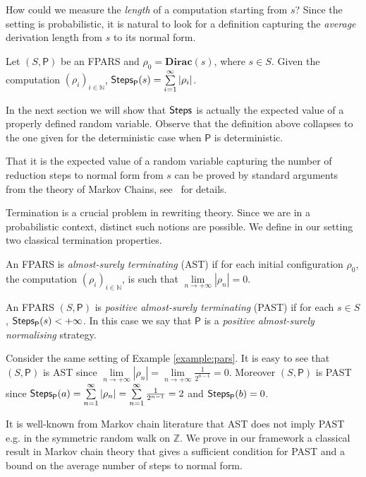 How could we measure the \emph{length} of a computation starting from $s$? Since the setting is probabilistic, it is natural
to look for a definition capturing the \emph{average} derivation length from
$s$ to its normal form. 
\begin{definition}
	Let $(S,\mathsf{P})$ be an FPARS and $\rho_0=\mathbf{Dirac}(s)$,
	where $s\in S$. Given the computation $(\rho_i)_{i\in\mathbb{N}}$,
	$\textsf{Steps}_{\mathsf{P}}(s)=\sum\limits_{i=1}^{\infty} \left|\rho_i\right|$.
\end{definition}
In the next section we will show that $\textsf{Steps}_{}$ is actually the expected value of a properly defined random variable. Observe that the definition above collapses to the one given for the
deterministic case when $\mathsf{P}$ is deterministic. 
\begin{SHORT}
	That it is the expected value of a random variable capturing the number of reduction
	steps to normal form from $s$ can be proved by standard arguments
	from the theory of Markov Chains, see~\cite{EV} for details.
\end{SHORT}
Termination is a crucial problem in rewriting theory. Since we are in
a probabilistic context, distinct such notions are
possible. We define in our setting two classical termination
properties.  
\begin{definition}[AST]
	An FPARS is \emph{almost-surely terminating} (AST) if for each initial configuration $\rho_0$, the computation $(\rho_i)_{i\in\mathbb{N}}$, is such that $\underset{n\rightarrow +\infty}{\lim}\left|\rho_{n}\right|=0$.
\end{definition}
\begin{definition}[PAST]
	An FPARS $(S,\mathsf{P})$ is \emph{positive almost-surely terminating} (PAST) if for each $s \in S$,
	$\textsf{Steps}_{\mathsf{P}}(s)< +\infty$.
	In this case we say that $\mathsf{P}$ is a \emph{positive almost-surely normalising} strategy.
\end{definition}
\begin{example}
	Consider the same setting of Example \ref{example:pars}. It is easy to see that $(S,\mathsf{P})$ is AST since $\underset{n\rightarrow +\infty}{\lim}\left|\rho_{n}\right|=\underset{n\rightarrow +\infty}{\lim}\frac{1}{2^{n-1}}=0$. Moreover $(S,\mathsf{P})$ is PAST since $\textsf{Steps}_{\mathsf{P}}(a)=\sum\limits_{n=1}^{\infty} \left|\rho_n\right|=\sum\limits_{n=1}^{\infty}\frac{1}{2^{n-1}}=2$ and $\textsf{Steps}_{\mathsf{P}}(b)=0$.
\end{example}
It is well-known from Markov chain literature that AST does not imply PAST e.g. in the symmetric random walk on $\mathbb{Z}$. We prove in our framework a classical result in Markov chain theory that gives a sufficient condition for PAST and a bound on the average number of steps to normal form.
